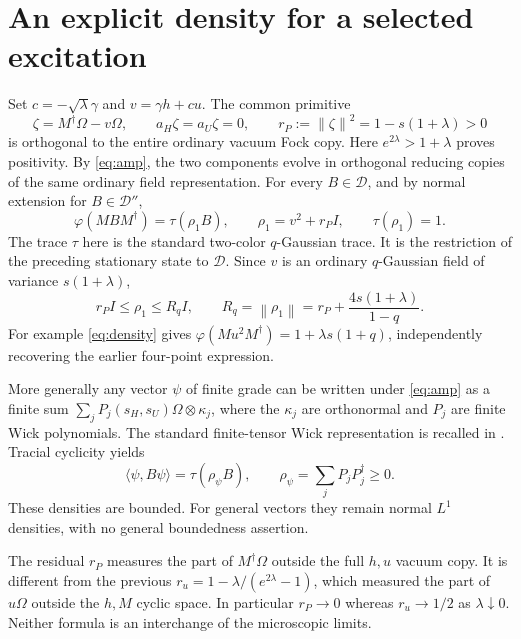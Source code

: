 \documentclass[11pt]{article}
\newcommand{\DD}{\mathcal D}
\newcommand{\norm}[1]{\left\lVert#1\right\rVert}
\begin{document}
\newpage
\section{An explicit density for a selected excitation}
Set $c=-\sqrt\lambda\gamma$ and $v=\gamma h+cu$.
The common primitive
\begin{equation}
 \zeta=M^\dagger\Omega-v\Omega,\qquad
 a_H\zeta=a_U\zeta=0,\qquad
 r_P:=\norm{\zeta}^2=1-s(1+\lambda)>0
\end{equation}
is orthogonal to the entire ordinary vacuum Fock copy.
Here $e^{2\lambda}>1+\lambda$ proves positivity. By
\eqref{eq:amp}, the two components evolve in orthogonal reducing
copies of the same ordinary field representation. For every
$B\in\DD$, and by normal extension for $B\in\DD''$,
\begin{equation}\label{eq:density}
 \varphi(M B M^\dagger)=\tau(\rho_1 B),\qquad
 \rho_1=v^2+r_PI,\qquad \tau(\rho_1)=1.
\end{equation}
The trace $\tau$ here is the standard two-color $q$-Gaussian trace.
It is the restriction of the preceding stationary state to $\DD$.
Since $v$ is an ordinary $q$-Gaussian field of variance
$s(1+\lambda)$,
\begin{equation}\label{eq:densitybound}
 r_PI\le\rho_1\le R_q I,\qquad
 R_q=\norm{\rho_1}=r_P+\frac{4s(1+\lambda)}{1-q}.
\end{equation}
For example \eqref{eq:density} gives
$\varphi(Mu^2M^\dagger)=1+\lambda s(1+q)$, independently recovering
the earlier four-point expression.

More generally any vector $\psi$ of finite grade can be written
under \eqref{eq:amp} as a finite sum
$\sum_j P_j(s_H,s_U)\Omega\otimes\kappa_j$, where the
$\kappa_j$ are orthonormal and $P_j$ are finite Wick polynomials.
The standard finite-tensor Wick representation is recalled in
\cite{Ricard}. Tracial cyclicity yields
\begin{equation}
 \langle\psi,B\psi\rangle=\tau(\rho_\psi B),\qquad
 \rho_\psi=\sum_j P_jP_j^\dagger\ge0.
\end{equation}
These densities are bounded. For general vectors they remain
normal $L^1$ densities, with no general boundedness assertion.

The residual $r_P$ measures the part of $M^\dagger\Omega$ outside
the full $h,u$ vacuum copy. It is different from the previous
$r_u=1-\lambda/(e^{2\lambda}-1)$, which measured the part of
$u\Omega$ outside the $h,M$ cyclic space. In particular
$r_P\to0$ whereas $r_u\to1/2$ as $\lambda\downarrow0$.
Neither formula is an interchange of the microscopic limits.
\end{document}
